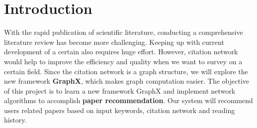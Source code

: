 \section{Introduction}

With the rapid publication of scientific literature, conducting a comprehensive literature review has become more challenging. Keeping up with current development of a certain also requires huge effort. However, citation network would help to improve the efficiency and quality when we want to survey on a certain field. Since the citation network is a graph structure, we will explore the new framework \textbf{GraphX}, which makes graph computation easier. The objective of this project is to learn a new framework GraphX and implement network algorithms to accomplish \textbf{paper recommendation}. Our system will recommend users related papers based on input keywords, citation network and reading history. 
